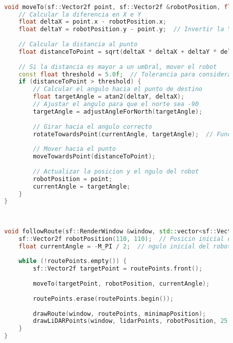 \begin{lstlisting}[language={C++}, caption={Quinto ajuste de c\'odigo}, label={QuintoAjuste}]
        
        
        
        void moveTo(sf::Vector2f point, sf::Vector2f &robotPosition, float &currentAngle) {
            // Calcular la diferencia en X e Y
            float deltaX = point.x - robotPosition.x;
            float deltaY = robotPosition.y - point.y;  // Invertir la Y para la pantalla
        
            // Calcular la distancia al punto
            float distanceToPoint = sqrt(deltaX * deltaX + deltaY * deltaY);
        
            // Si la distancia es mayor a un umbral, mover el robot
            const float threshold = 5.0f;  // Tolerancia para considerar que el punto ha sido alcanzado
            if (distanceToPoint > threshold) {
                // Calcular el angulo hacia el punto de destino
                float targetAngle = atan2(deltaY, deltaX);
                // Ajustar el angulo para que el norte sea -90
                targetAngle = adjustAngleForNorth(targetAngle);
        
                // Girar hacia el angulo correcto
                rotateTowardsPoint(currentAngle, targetAngle);  // Funcin para girar hacia el ngulo
        
                // Mover hacia el punto
                moveTowardsPoint(distanceToPoint);
                
                // Actualizar la posicion y el ngulo del robot
                robotPosition = point;
                currentAngle = targetAngle;
            }
        }
        
        
        
        void followRoute(sf::RenderWindow &window, std::vector<sf::Vector2f> &routePoints, const LaserScan &lidarPoints, const sf::Vector2f &minimapPosition, float max_range) {
            sf::Vector2f robotPosition(110, 110);  // Posicin inicial del robot en el minimapa
            float currentAngle = -M_PI / 2;  // ngulo inicial del robot (norte en -90)
        
            while (!routePoints.empty()) {
                sf::Vector2f targetPoint = routePoints.front();
        
                moveTo(targetPoint, robotPosition, currentAngle);
        
                routePoints.erase(routePoints.begin());
        
                drawRoute(window, routePoints, minimapPosition);
                drawLiDARPoints(window, lidarPoints, robotPosition, 25.0f, max_range);
            }
        }
        

\end{lstlisting}
